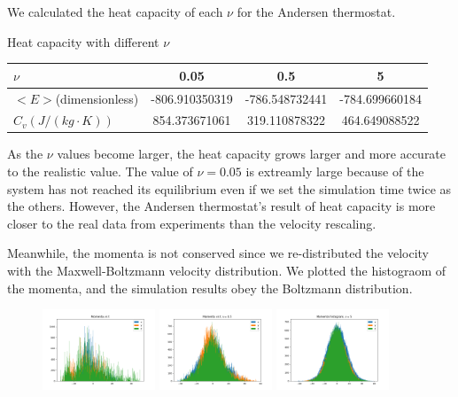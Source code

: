 \documentclass{article}
\begin{document}
\begin{spacing}{1}
We calculated the heat capacity of each $\nu$ for the Andersen thermostat.


\begin{center}
Heat capacity with different $\nu$

\begin{tabular}{lccc}
\hline
$\nu$ & 0.05 & 0.5 & 5\\ \hline  
$<E>$(dimensionless) & -806.910350319 & -786.548732441 & -784.699660184 \\
$C_v(J/(kg\cdot K))$ & 854.373671061 & 319.110878322 & 464.649088522 \\\hline
\end{tabular}
\end{center}

As the $\nu$ values become larger, the heat capacity grows larger and more accurate to the realistic value. The value of $\nu=0.05$ is extreamly large because of the system has not reached its equilibrium even if we set the simulation time twice as the others. However, the Andersen thermostat's result of heat capacity is more closer to the real data from experiments than the velocity rescaling.

Meanwhile, the momenta is not conserved since we re-distributed the velocity with the Maxwell-Boltzmann velocity distribution. We plotted the histograom of the momenta, and the simulation results obey the Boltzmann distribution.

\begin{figure}[htbp]
  \centering
  \includegraphics[width=0.3\textwidth]{andersen/nu005/test/momenta.png}
  \includegraphics[width=0.3\textwidth]{andersen/nu05/test/momenta.png}
  \includegraphics[width=0.3\textwidth]{andersen/nu5/test/momenta.png}
\end{figure}



\end{spacing}
\end{document}
